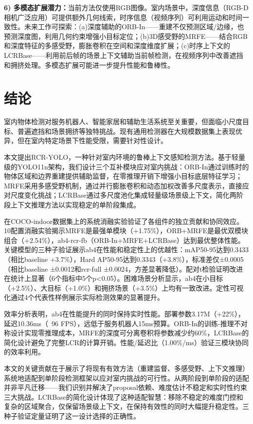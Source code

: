 \documentclass[journal]{IEEEtran}
\begin{document}
\textbf{6) 多模态扩展潜力：}当前方法仅使用RGB图像。室内场景中，深度信息（RGB-D相机广泛应用）可提供额外几何线索，时序信息（视频序列）可利用运动和时间一致性。未来工作可探索：(a)深度辅助的ORB-In——重建不仅预测区域/边缘，也预测深度图，利用几何约束增强小目标定位；(b)3D感受野的MRFE——结合RGB和深度特征的多感受野，膨胀卷积在空间和深度维度扩展；(c)时序上下文的LCRBase——利用前后帧的场景上下文辅助当前帧检测，在视频序列中改善遮挡和拥挤处理。多模态扩展可能进一步提升性能和鲁棒性。


\section{结论}
\label{sec:conclusion}

室内物体检测对服务机器人、智能家居和辅助生活系统至关重要，但面临小尺度目标、普遍遮挡和场景拥挤等独特挑战。现有通用检测器在大规模数据集上表现优异，但在室内特定场景下性能受限，需要针对性设计。

本文提出RCR-YOLO，一种针对室内环境的鲁棒上下文感知检测方法。基于轻量级的YOLO11n架构，我们设计三个互补模块应对室内挑战：ORB-In通过训练时的物体区域和边界重建提供辅助监督，在零推理开销下增强小目标底层特征学习；MRFE采用多感受野机制，通过并行膨胀卷积和动态加权改善多尺度表示，直接应对尺度变化挑战；LCRBase通过多尺度池化集成轻量级场景级上下文，简化两阶段上下文推理方法以实现稳定的单阶段集成。

在COCO-indoor数据集上的系统消融实验验证了各组件的独立贡献和协同效应。10配置消融实验揭示MRFE是最强单模块（+1.75\%），ORB+MRFE是最优双模块组合（+2.54\%），ab4-rcr-fb（ORB-In+MRFE+LCRBase）达到最优整体性能。关键模型的三种子验证展示ab4在性能和稳定性上的优越性：mAP50-95达到0.3433（相比baseline +3.7\%），Hard AP50-95达到0.3343（+3.8\%），标准差仅±0.0005（相比baseline ±0.0012和rcr-full ±0.0024，方差显著降低）。配对t检验证明改进在统计上显著（6个指标中5个p<0.05）。困难场景分析显示，ab4在小目标（+2.5\%）、大目标（+1.0\%）和拥挤场景（+3.5\%）上均有一致改进。定性可视化通过4个代表性样例展示实际检测效果的显著提升。

效率分析表明，ab4在性能提升的同时保持实时性能。部署参数3.17M（+22\%），延迟10.36ms（~96 FPS），远低于服务机器人15ms预算。ORB-In的训练-推理不对称设计实现零推理成本，MRFE的深度可分离卷积将参数减少约60\%，LCRBase的简化设计避免了完整LCR的计算开销。性能/延迟比（1.00\%/ms）验证三模块协同的效率利用。

本文的关键贡献在于展示了将现有有效方法（重建监督、多感受野、上下文推理）系统地适配到单阶段检测框架以应对室内挑战的可行性。从两阶段到单阶段的适配并非平凡迁移——我们识别并解决了proposal依赖、难度估计不稳定和实时性约束三大挑战。LCRBase的简化设计体现了这种适配智慧：移除不稳定的难度门控和复杂的区域聚合，仅保留场景级上下文，在保持有效性的同时大幅提升稳定性。三种子验证定量证明了这一设计选择的正确性。
\end{document}
